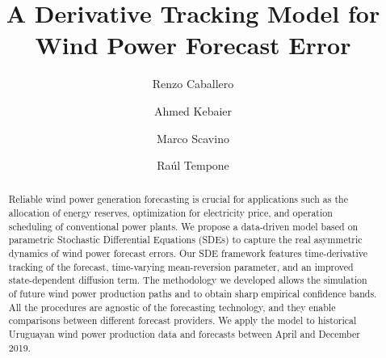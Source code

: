 \documentclass[11pt]{article}
\theoremstyle{definition}
\newcommand{\red}{\textcolor{black}}
\begin{document}
\title{A Derivative Tracking Model for Wind Power Forecast Error}  %

\author[1]{Renzo Caballero\orcidA{}}
\author[2]{Ahmed Kebaier\orcidC{}}
\author[3]{Marco Scavino\orcidD{}}
\author[4]{Ra\'ul Tempone\orcidB{}}
\affil[2]{\red{Universit\'e Sorbonne Paris Nord, LAGA, CNRS, UMR 7539, F-93430, Villetaneuse, France}}
\date{}


\maketitle


\begin{abstract}

Reliable wind power generation forecasting is crucial for applications such as the allocation of energy reserves, optimization for electricity price, and operation scheduling of conventional power plants. We propose a data-driven model based on parametric Stochastic Differential Equations (SDEs) to capture the real asymmetric dynamics of wind power forecast errors. Our SDE framework features time-derivative tracking of the forecast, time-varying mean-reversion parameter, and an improved state-dependent diffusion term. The methodology we developed allows the simulation of future wind power production paths and to obtain sharp empirical confidence bands. All the procedures are agnostic of the forecasting technology, and they enable comparisons between different forecast providers. We apply the model to historical Uruguayan wind power production data and forecasts between April and December 2019.

\end{abstract}
\end{document}
